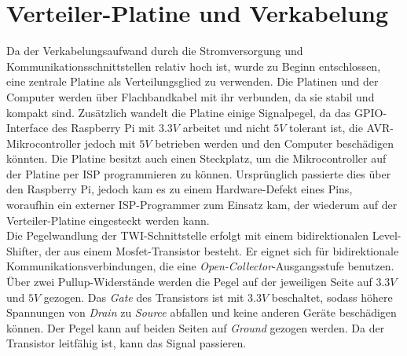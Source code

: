 \section{Verteiler-Platine und Verkabelung}
Da der Verkabelungsaufwand durch die Stromversorgung und Kommunikationsschnittstellen relativ hoch ist, wurde zu Beginn entschlossen, eine zentrale Platine als Verteilungsglied zu verwenden. Die Platinen und der Computer werden über Flachbandkabel mit ihr verbunden, da sie stabil und kompakt sind. Zusätzlich wandelt die Platine einige Signalpegel, da das \ac{GPIO}-Interface des Raspberry Pi mit $3.3V$ arbeitet und nicht $5V$ tolerant ist, die AVR-Mikrocontroller jedoch mit $5V$ betrieben werden und den Computer beschädigen könnten. Die Platine besitzt auch einen Steckplatz, um die Mikrocontroller auf der Platine per \ac{ISP} programmieren zu können. Ursprünglich passierte dies über den Raspberry Pi, jedoch kam es zu einem Hardware-Defekt eines Pins, woraufhin ein externer ISP-Programmer zum Einsatz kam, der wiederum auf der Verteiler-Platine eingesteckt werden kann.\\
Die Pegelwandlung der \ac{TWI}-Schnittstelle erfolgt mit einem bidirektionalen Level-Shifter, der aus einem Mosfet-Transistor besteht. Er eignet sich für bidirektionale Kommunikationsverbindungen, die eine \textit{Open-Collector}-Ausgangsstufe benutzen. Über zwei Pullup-Widerstände werden die Pegel auf der jeweiligen Seite auf $3.3V$ und $5V$ gezogen. Das \textit{Gate} des Transistors ist mit $3.3V$ beschaltet, sodass höhere Spannungen von \textit{Drain} zu \textit{Source} abfallen und keine anderen Geräte beschädigen können. Der Pegel kann auf beiden Seiten auf \textit{Ground} gezogen werden. Da der Transistor leitfähig ist, kann das Signal passieren.\cite{web:levelshifter}

